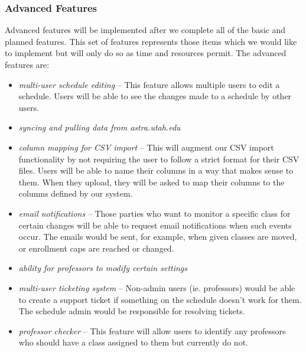 \documentclass{extarticle}
\begin{document}
\subsubsection{Advanced Features}
Advanced features will be implemented after we complete all of the basic and planned features.  This set of features
represents those items which we would like to implement but will only do so as time and resources permit.  The
advanced features are:
\begin{itemize}
\item \emph{multi-user schedule editing} -- This feature allows multiple users to edit a schedule. Users will be able to
see the changes made to a schedule by other users.
\item \emph{syncing and pulling data from astra.utah.edu} %
\item \emph{column mapping for CSV import} -- This will augment our CSV import functionality by not requiring the
user to follow a strict format for their CSV files.  Users will be able to name their columns in a way that makes
sense to them. When they upload, they will be asked to map their columns to the columns defined by our system.
\item \emph{email notifications} -- Those parties who want to monitor a specific class for certain changes will be
able to request email notifications when such events occur.  The emails would be sent, for example, when given
classes are moved, or enrollment caps are reached or changed.
\item \emph{ability for professors to modify certain settings} %
\item \emph{multi-user ticketing system} -- Non-admin users (ie. professors) would be able to create a support
ticket if something on the schedule doesn't work for them. The schedule admin would be responsible for resolving tickets.
\item \emph{professor checker} -- This feature will allow users to identify any professors who should have a class
assigned to them but currently do not.
\end{itemize}

\newpage
\end{document}
